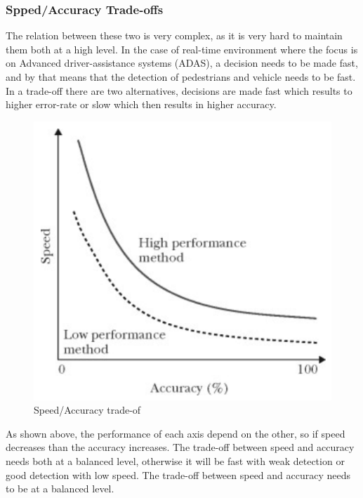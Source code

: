         \subsubsection{Spped/Accuracy Trade-offs}
            The relation between these two is very complex, as it is very hard to maintain them both
            at a high level. In the case of real-time environment where the focus is on Advanced
            driver-assistance systems (ADAS), a decision needs to be made fast, and by that means
            that the detection of pedestrians and vehicle needs to be fast. In a trade-off there are two
            alternatives, decisions are made fast which results to higher error-rate or slow which then
            results in higher accuracy.
            \begin{figure}[H]
                \centering
                \includegraphics[width=0.6\linewidth]{img/trade-off.png}
                \caption{Speed/Accuracy trade-of}
            \end{figure}
            As shown above, the performance of each axis depend on the other, so if speed
            decreases than the accuracy increases. The trade-off between speed and accuracy needs
            both at a balanced level, otherwise it will be fast with weak detection or good detection
            with low speed. The trade-off between speed and accuracy needs to be at a balanced
            level.

